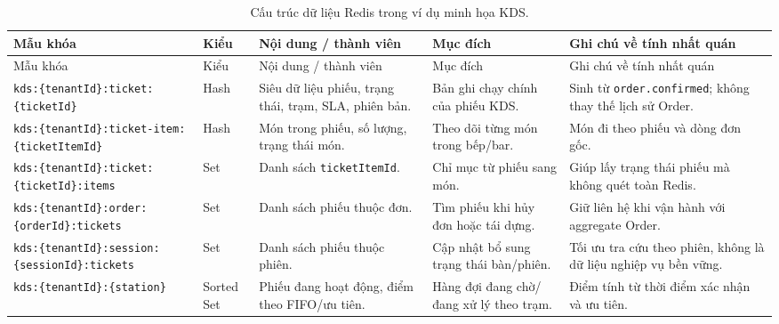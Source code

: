 {\scriptsize
\setlength{\tabcolsep}{1pt}
\begin{longtable}{>{\raggedright\arraybackslash}p{}>{\raggedright\arraybackslash}p{}>{\raggedright\arraybackslash}p{}>{\raggedright\arraybackslash}p{}>{\raggedright\arraybackslash}p{}}
  \caption{Cấu trúc dữ liệu Redis trong ví dụ minh họa KDS.}
  \label{tab:chapter4-kds-redis-data-structures}\\
  \toprule
  Mẫu khóa & Kiểu & Nội dung / thành viên & Mục đích & Ghi chú về tính nhất quán \\
  \midrule
  \endfirsthead
  \toprule
  Mẫu khóa & Kiểu & Nội dung / thành viên & Mục đích & Ghi chú về tính nhất quán \\
  \midrule
  \endhead
  \bottomrule
  \endfoot
  \texttt{kds:\{tenantId\}:}\newline\texttt{ticket:\{ticketId\}} & Hash & Siêu dữ liệu phiếu, trạng thái, trạm, SLA, phiên bản. & Bản ghi chạy chính của phiếu KDS. & Sinh từ \texttt{order.confirmed}; không thay thế lịch sử Order. \\
  \texttt{kds:\{tenantId\}:}\newline\texttt{ticket-item:\{ticketItemId\}} & Hash & Món trong phiếu, số lượng, trạng thái món. & Theo dõi từng món trong bếp/bar. & Món đi theo phiếu và dòng đơn gốc. \\
  \texttt{kds:\{tenantId\}:}\newline\texttt{ticket:\{ticketId\}:items} & Set & Danh sách \texttt{ticketItemId}. & Chỉ mục từ phiếu sang món. & Giúp lấy trạng thái phiếu mà không quét toàn Redis. \\
  \texttt{kds:\{tenantId\}:}\newline\texttt{order:\{orderId\}:tickets} & Set & Danh sách phiếu thuộc đơn. & Tìm phiếu khi hủy đơn hoặc tái dựng. & Giữ liên hệ khi vận hành với aggregate Order. \\
  \texttt{kds:\{tenantId\}:}\newline\texttt{session:}\newline\texttt{\{sessionId\}:tickets} & Set & Danh sách phiếu thuộc phiên. & Cập nhật bổ sung trạng thái bàn/phiên. & Tối ưu tra cứu theo phiên, không là dữ liệu nghiệp vụ bền vững. \\
  \texttt{kds:\{tenantId\}:}\newline\texttt{\{station\}} & Sorted Set & Phiếu đang hoạt động, điểm theo FIFO/ưu tiên. & Hàng đợi đang chờ/đang xử lý theo trạm. & Điểm tính từ thời điểm xác nhận và ưu tiên. \\

\end{longtable}}
